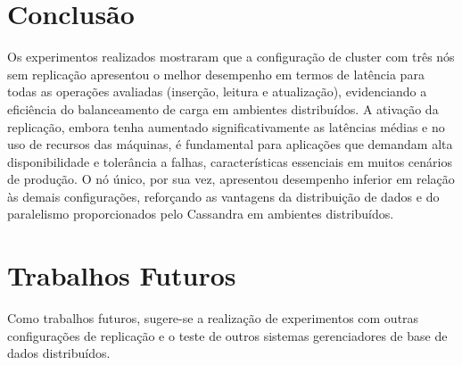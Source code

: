 \section{Conclusão}

Os experimentos realizados mostraram que a configuração de cluster com três nós sem replicação apresentou o melhor desempenho em termos de latência para
todas as operações avaliadas (inserção, leitura e atualização), evidenciando a eficiência do balanceamento de carga em ambientes distribuídos. 
A ativação da replicação, embora tenha aumentado significativamente as latências médias e no uso de recursos das máquinas, é fundamental para aplicações que demandam alta disponibilidade 
e tolerância a falhas, características essenciais em muitos cenários de produção.
O nó único, por sua vez, apresentou desempenho inferior em relação às demais configurações,
reforçando as vantagens da distribuição de dados e do paralelismo proporcionados pelo Cassandra em ambientes distribuídos.

\section{Trabalhos Futuros}

Como trabalhos futuros, sugere-se a realização de experimentos com outras configurações de replicação e o teste de outros sistemas gerenciadores de base de dados distribuídos.
